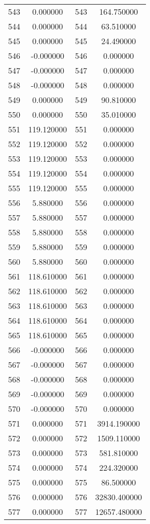 \documentclass[12pt]{article}
\begin{document}
\begin{longtable}{@{}cccc@{}}
543 & 0.000000 & 543 & 164.750000 \\
544 & 0.000000 & 544 & 63.510000 \\
545 & 0.000000 & 545 & 24.490000 \\
546 & -0.000000 & 546 & 0.000000 \\
547 & -0.000000 & 547 & 0.000000 \\
548 & -0.000000 & 548 & 0.000000 \\
549 & 0.000000 & 549 & 90.810000 \\
550 & 0.000000 & 550 & 35.010000 \\
551 & 119.120000 & 551 & 0.000000 \\
552 & 119.120000 & 552 & 0.000000 \\
553 & 119.120000 & 553 & 0.000000 \\
554 & 119.120000 & 554 & 0.000000 \\
555 & 119.120000 & 555 & 0.000000 \\
556 & 5.880000 & 556 & 0.000000 \\
557 & 5.880000 & 557 & 0.000000 \\
558 & 5.880000 & 558 & 0.000000 \\
559 & 5.880000 & 559 & 0.000000 \\
560 & 5.880000 & 560 & 0.000000 \\
561 & 118.610000 & 561 & 0.000000 \\
562 & 118.610000 & 562 & 0.000000 \\
563 & 118.610000 & 563 & 0.000000 \\
564 & 118.610000 & 564 & 0.000000 \\
565 & 118.610000 & 565 & 0.000000 \\
566 & -0.000000 & 566 & 0.000000 \\
567 & -0.000000 & 567 & 0.000000 \\
568 & -0.000000 & 568 & 0.000000 \\
569 & -0.000000 & 569 & 0.000000 \\
570 & -0.000000 & 570 & 0.000000 \\
571 & 0.000000 & 571 & 3914.190000 \\
572 & 0.000000 & 572 & 1509.110000 \\
573 & 0.000000 & 573 & 581.810000 \\
574 & 0.000000 & 574 & 224.320000 \\
575 & 0.000000 & 575 & 86.500000 \\
576 & 0.000000 & 576 & 32830.400000 \\
577 & 0.000000 & 577 & 12657.480000 \\

\end{longtable}
\end{document}
